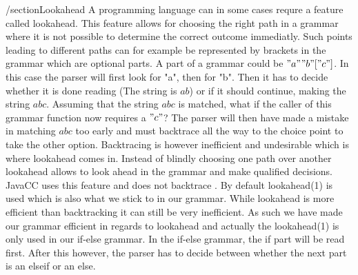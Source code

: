 /section{Lookahead}
A programming language can in some cases requre a feature called lookahead. This feature allows for choosing the right path in a grammar where it is not possible to determine the correct outcome immediatly. Such points leading to different paths can for example be represented by brackets in the grammar which are optional parts. A part of a grammar could be $"a" "b" ["c"]$. In this case the parser will first look for "a", then for "b". Then it has to decide whether it is done reading (The string is $ab$) or if it should continue, making the string $abc$. Assuming that the string $abc$ is matched, what if the caller of this grammar function now requires a $"c"$? The parser will then have made a mistake in matching $abc$ too early and must backtrace all the way to the choice point to take the other option. Backtracing is however inefficient and undesirable which is where lookahead comes in. Instead of blindly choosing one path over another lookahead allows to look ahead in the grammar and make qualified decisions. JavaCC uses this feature and does not backtrace . By default lookahead(1) is used which is also what we stick to in our grammar. While lookahead is more efficient than backtracking it can still be very inefficient. As such we have made our grammar efficient in regards to lookahead and actually the lookahead(1) is only used in our if-else grammar. In the if-else grammar, the if part will be read first. After this however, the parser has to decide between whether the next part is an elseif or an else.
